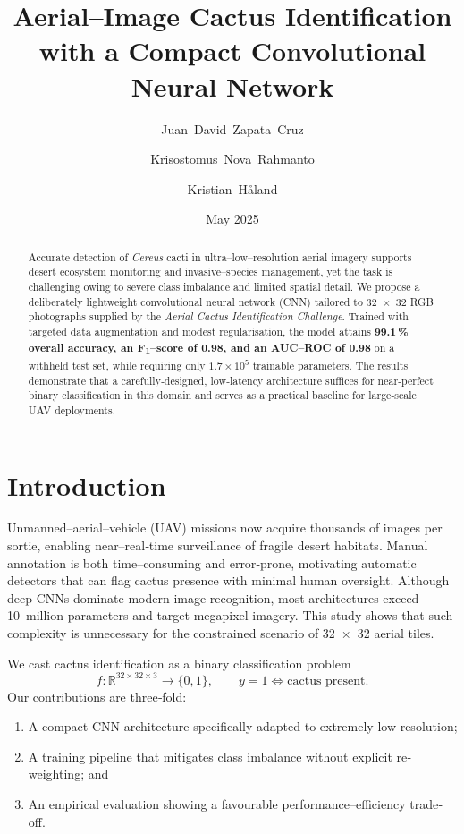 \documentclass[11pt,a4paper]{article}
\title{Aerial--Image Cactus Identification with a Compact Convolutional Neural Network}
\author[1]{Juan~David~Zapata~Cruz}
\author[2]{Krisostomus~Nova~Rahmanto}
\author[3]{Kristian~H{\aa}land}
\affil[1]{Department of Computer Science, University A}
\affil[2]{School of Electrical Engineering, University B}
\affil[3]{Institute of Environmental Modelling, University C}
\date{May 2025}
\begin{document}
\maketitle

\begin{abstract}
Accurate detection of \textit{Cereus} cacti in ultra--low--resolution aerial imagery supports desert ecosystem monitoring and invasive--species management, yet the task is challenging owing to severe class imbalance and limited spatial detail.  
We propose a deliberately lightweight convolutional neural network (CNN) tailored to \SI{32 x 32}{\pixel} RGB photographs supplied by the \emph{Aerial Cactus Identification Challenge}.  
Trained with targeted data augmentation and modest regularisation, the model attains \textbf{99.1\,\% overall accuracy, an F\textsubscript{1}--score of 0.98, and an AUC--ROC of 0.98} on a withheld test set, while requiring only $1.7\times 10^{5}$ trainable parameters.  
The results demonstrate that a carefully‐designed, low‐latency architecture suffices for near‐perfect binary classification in this domain and serves as a practical baseline for large‐scale UAV deployments.
\end{abstract}

\section{Introduction}\label{sec:intro}

Unmanned–aerial–vehicle (UAV) missions now acquire thousands of images per sortie, enabling near–real‐time surveillance of fragile desert habitats.  
Manual annotation is both time–consuming and error‐prone, motivating automatic detectors that can flag cactus presence with minimal human oversight.  
Although deep CNNs dominate modern image recognition, most architectures exceed \num{10}~million parameters and target megapixel imagery.  
This study shows that such complexity is unnecessary for the constrained scenario of \SI{32 x 32}{\pixel} aerial tiles.

We cast cactus identification as a binary classification problem
%
\[
f : \mathbb{R}^{32\times 32 \times 3} \longrightarrow \{0,1\}, 
\qquad 
y = 1 \iff \text{cactus present}.
\]
%
Our contributions are three‐fold:
\begin{enumerate}
  \item A compact CNN architecture specifically adapted to extremely low resolution;
  \item A training pipeline that mitigates class imbalance without explicit re‐weighting; and
  \item An empirical evaluation showing a favourable performance–efficiency trade‐off.
\end{enumerate}
\end{document}
